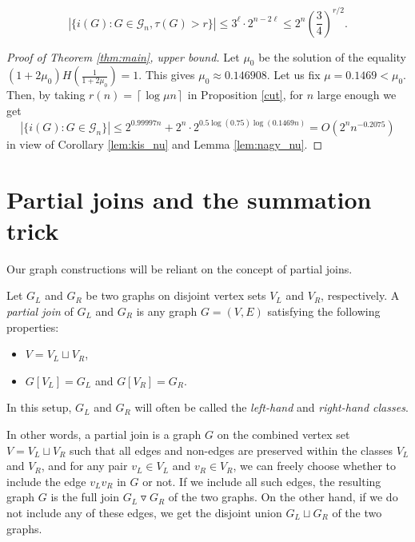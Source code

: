 \documentclass[10pt,a4paper]{article}
\numberwithin{equation}{section}
\newcommand{\cG}{\mathcal{G}}
\begin{document}
    \begin{lemma} \label{lem:nagy_nu}
       $$|\{i(G): G\in \cG_n, \tau(G)> r\}|\le 3^{\ell}\cdot 2^{n-2\ell}\le 2^n\left(\frac34\right)^{r/2}.$$
    \end{lemma}


\begin{proof}[Proof of Theorem \ref{thm:main}, upper bound]
    Let $\mu_0$ be the solution of the equality $(1+2\mu_0)H\left(\frac{1}{1+2\mu_0}\right)=1.$ This gives $\mu_0\approx 0.146908.$ Let us fix $\mu=0.1469<\mu_0$.  
    Then, by taking $r(n)=\left\lceil \log \mu n\right\rceil$ in Proposition \ref{cut}, for $n$ large enough we get  $$ |\{i(G): G\in \cG_n\}|\le 2^{0.99997n} + 2^n\cdot 2^{0.5\log(0.75)\log (0.1469n)}=O(2^n n^{-0.2075})$$ in view of Corollary \ref{lem:kis_nu} and Lemma  \ref{lem:nagy_nu}.
\end{proof}

\section{Partial joins and the summation trick}\label{sec:partial}

Our graph constructions will be reliant on the concept of partial joins.

\begin{definition}
Let $G_L$ and $G_R$ be two graphs on disjoint vertex sets $V_L$ and $V_R$, respectively. A \textit{partial join} of $G_L$ and $G_R$ is any graph $G=(V,E)$ satisfying the following properties:
\begin{itemize}
\itemsep0em
\item $V=V_L\sqcup V_R$,
\item $G[V_L]=G_L$ and $G[V_R]=G_R$.
\end{itemize}
In this setup, $G_L$ and $G_R$ will often be called the \textit{left-hand} and \textit{right-hand classes}.
\end{definition}

In other words, a partial join is a graph $G$ on the combined vertex set $V=V_L\sqcup V_R$ such that all edges and non-edges are preserved within the classes $V_L$ and $V_R$, and for any pair $v_L\in V_L$ and $v_R\in V_R$, we can freely choose whether to include the edge $v_Lv_R$ in $G$ or not. If we include all such edges, the resulting graph $G$ is the full join $G_L\triangledown G_R$ of the two graphs. On the other hand, if we do not include any of these edges, we get the disjoint union $G_L\sqcup G_R$ of the two graphs.
\end{document}
